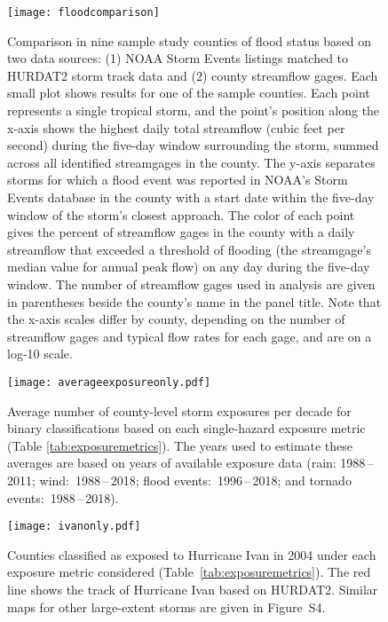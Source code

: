 \begin{figure}[tbhp!]
\centering
\texttt{[image: floodcomparison]}
\caption{Comparison in nine sample study counties of flood status based on
	two data sources: (1) NOAA Storm Events listings matched to \ac{HURDAT2} storm track data
	and (2) county streamflow gages. Each small plot shows results for one of the sample
	counties. Each point represents a single tropical storm, and the
	point's position along the x-axis shows the highest daily total
	streamflow (cubic feet per second) during the five-day window surrounding the storm, 
	summed across all identified
	streamgages in the county. The y-axis separates storms
	for which a flood event was reported in NOAA's Storm Events database
	in the county with a start date within the five-day window of the
	storm's closest approach. The color of each point gives
	the percent of streamflow gages in the county with a daily streamflow
	that exceeded a threshold of flooding (the streamgage's median value
	for annual peak flow) on any day during the five-day window. The number
	of streamflow gages used in analysis are given in parentheses beside
	the county's name in the panel title.  Note that the x-axis scales
	differ by county, depending on the number of streamflow gages and
	typical flow rates for each gage, and are on a log-10 scale.
	}
\label{fig:floodcomparison}
\end{figure}

\clearpage

\begin{figure}%
\centering
\texttt{[image: averageexposureonly.pdf]} 
\caption{Average number of county-level storm exposures per decade for binary 
	classifications based on each
	single-hazard exposure metric (Table \ref{tab:exposuremetrics}). The years used to
	estimate these averages are based on years of available exposure data
	(rain: 1988\,--\,2011; wind:~1988\,--\,2018; flood events:~1996\,--\,2018; and
	tornado events:~1988\,--\,2018). } 
\label{fig:averageexposure} 
\end{figure}

\clearpage

\begin{figure}%
\centering
\texttt{[image: ivanonly.pdf]}
\caption{Counties classified as exposed to Hurricane Ivan in 2004 under each
	exposure metric considered (Table~\ref{tab:exposuremetrics}). The red
	line shows the track of Hurricane Ivan based on
	\ac{HURDAT2}.  Similar maps for other
	large-extent storms are given in Figure~S4.
	}
\label{fig:ivanexposure} 
\end{figure}

